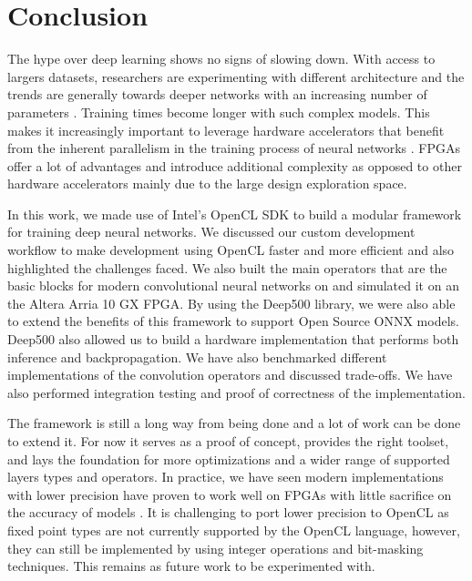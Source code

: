 
\chapter{Conclusion} %

\label{Chapter6} %

The hype over deep learning shows no signs of slowing down. With access to largers datasets, researchers are experimenting with different architecture and the trends are generally towards deeper networks with an increasing number of parameters \citep{ddl}. Training times become longer with such complex models. This makes it increasingly important to leverage hardware accelerators that benefit from the inherent parallelism in the training process of neural networks \cite{ddl}. FPGAs offer a lot of advantages and introduce additional complexity as opposed to other hardware accelerators mainly due to the large design exploration space.

In this work, we made use of Intel's OpenCL SDK \cite{intel2016sdk} to build a modular framework for training deep neural networks. We discussed our custom development workflow to make development using OpenCL faster and more efficient and also highlighted the challenges faced. We also built the main operators that are the basic blocks for modern convolutional neural networks on and simulated it on an the Altera Arria 10 GX FPGA. By using the Deep500 library, we were also able to extend the benefits of this framework to support Open Source ONNX \cite{onnx} models. Deep500 also allowed us to build a hardware implementation that performs both inference and backpropagation. We have also benchmarked different implementations of the convolution operators and discussed trade-offs. We have also performed integration testing and proof of correctness of the implementation. 

The framework is still a long way from being done and a lot of work can be done to extend it. For now it serves as a proof of concept, provides the right toolset, and lays the foundation for more optimizations and a wider range of supported layers types and operators. In practice, we have seen modern implementations with lower precision have proven to work well on FPGAs with little sacrifice on the accuracy of models \cite{gupta2015deep}. It is challenging to port lower precision to OpenCL as fixed point types are not currently supported by the OpenCL language, however, they can still be implemented by using integer operations and bit-masking techniques. This remains  as future work to be experimented with. 


